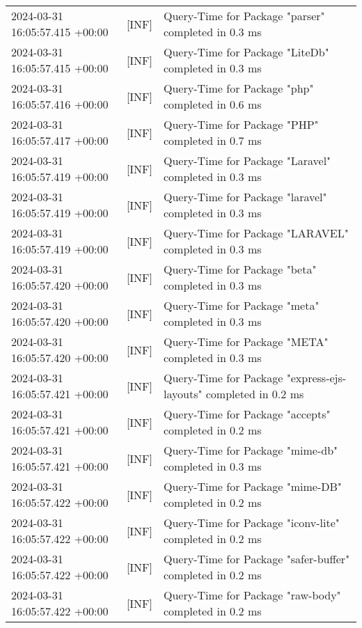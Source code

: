 {{\begin{tabularx}{\textwidth}{|l|l|X|}
                    2024-03-31 16:05:57.415 +00:00 & [INF] & Query-Time for Package "parser" completed in 0.3 ms \\
                    2024-03-31 16:05:57.415 +00:00 & [INF] & Query-Time for Package "LiteDb" completed in 0.3 ms \\
                    2024-03-31 16:05:57.416 +00:00 & [INF] & Query-Time for Package "php" completed in 0.6 ms \\
                    2024-03-31 16:05:57.417 +00:00 & [INF] & Query-Time for Package "PHP" completed in 0.7 ms \\
                    2024-03-31 16:05:57.419 +00:00 & [INF] & Query-Time for Package "Laravel" completed in 0.3 ms \\
                    2024-03-31 16:05:57.419 +00:00 & [INF] & Query-Time for Package "laravel" completed in 0.3 ms \\
                    2024-03-31 16:05:57.419 +00:00 & [INF] & Query-Time for Package "LARAVEL" completed in 0.3 ms \\
                    2024-03-31 16:05:57.420 +00:00 & [INF] & Query-Time for Package "beta" completed in 0.3 ms \\
                    2024-03-31 16:05:57.420 +00:00 & [INF] & Query-Time for Package "meta" completed in 0.3 ms \\
                    2024-03-31 16:05:57.420 +00:00 & [INF] & Query-Time for Package "META" completed in 0.3 ms \\
                    2024-03-31 16:05:57.421 +00:00 & [INF] & Query-Time for Package "express-ejs-layouts" completed in 0.2 ms \\
                    2024-03-31 16:05:57.421 +00:00 & [INF] & Query-Time for Package "accepts" completed in 0.2 ms \\
                    2024-03-31 16:05:57.421 +00:00 & [INF] & Query-Time for Package "mime-db" completed in 0.3 ms \\
                    2024-03-31 16:05:57.422 +00:00 & [INF] & Query-Time for Package "mime-DB" completed in 0.2 ms \\
                    2024-03-31 16:05:57.422 +00:00 & [INF] & Query-Time for Package "iconv-lite" completed in 0.2 ms \\
                    2024-03-31 16:05:57.422 +00:00 & [INF] & Query-Time for Package "safer-buffer" completed in 0.2 ms \\
                    2024-03-31 16:05:57.422 +00:00 & [INF] & Query-Time for Package "raw-body" completed in 0.2 ms \\

\end{tabularx}}}
